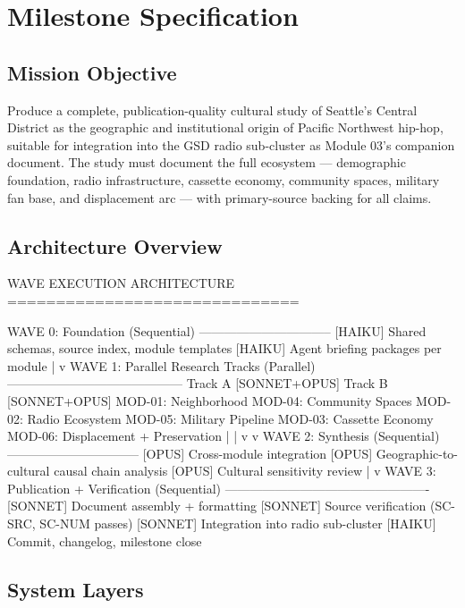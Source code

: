 \documentclass[11pt,letterpaper]{article}
\begin{document}
\section{Milestone Specification}

\subsection{Mission Objective}

Produce a complete, publication-quality cultural study of Seattle's Central District as the geographic and institutional origin of Pacific Northwest hip-hop, suitable for integration into the GSD radio sub-cluster as Module 03's companion document. The study must document the full ecosystem --- demographic foundation, radio infrastructure, cassette economy, community spaces, military fan base, and displacement arc --- with primary-source backing for all claims.

\subsection{Architecture Overview}

\begin{asciibox}
WAVE EXECUTION ARCHITECTURE
==============================

  WAVE 0: Foundation (Sequential)
  --------------------------------
  [HAIKU]  Shared schemas, source index, module templates
  [HAIKU]  Agent briefing packages per module
            |
            v
  WAVE 1: Parallel Research Tracks (Parallel)
  ------------------------------------------
  Track A [SONNET+OPUS]        Track B [SONNET+OPUS]
  MOD-01: Neighborhood         MOD-04: Community Spaces
  MOD-02: Radio Ecosystem      MOD-05: Military Pipeline
  MOD-03: Cassette Economy     MOD-06: Displacement + Preservation
            |                         |
            v                         v
  WAVE 2: Synthesis (Sequential)
  --------------------------------
  [OPUS]   Cross-module integration
  [OPUS]   Geographic-to-cultural causal chain analysis
  [OPUS]   Cultural sensitivity review
            |
            v
  WAVE 3: Publication + Verification (Sequential)
  -------------------------------------------------
  [SONNET] Document assembly + formatting
  [SONNET] Source verification (SC-SRC, SC-NUM passes)
  [SONNET] Integration into radio sub-cluster
  [HAIKU]  Commit, changelog, milestone close
\end{asciibox}

\subsection{System Layers}
\end{document}
